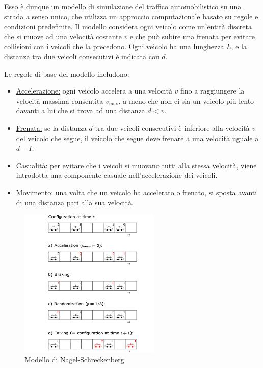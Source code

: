 \documentclass[11pt]{article}
\begin{document}
Esso è dunque un modello di simulazione del traffico automobilistico su una strada a senso unico, che utilizza un approccio computazionale basato su regole e condizioni predefinite.
Il modello considera ogni veicolo come un'entità discreta che si muove ad una velocità costante $v$ e che può subire una frenata per evitare collisioni con i veicoli che la precedono. Ogni veicolo ha una lunghezza $L$, e la distanza tra due veicoli consecutivi è indicata con $d$. 

Le regole di base del modello includono:
\begin{itemize}
\item \underline{Accelerazione:} ogni veicolo accelera a una velocità $v$ fino a raggiungere la velocità massima consentita $v_\max$, a meno che non ci sia un veicolo più lento davanti a lui che si trova ad una distanza $d<v$.

\item \underline{Frenata:} se la distanza $d$ tra due veicoli consecutivi è inferiore alla velocità $v$ del veicolo che segue, il veicolo che segue deve frenare a una velocità uguale a $d-I$.

\item \underline{Casualità:} per evitare che i veicoli si muovano tutti alla stessa velocità, viene introdotta una componente casuale nell'accelerazione dei veicoli.

\item \underline{Movimento:} una volta che un veicolo ha accelerato o frenato, si sposta avanti di una distanza pari alla sua velocità.
\end{itemize}

\begin{figure}
    \centering
    \includegraphics[width=0.6\textwidth]{trafficflow.png}
    \caption{Modello di Nagel-Schreckenberg}
\end{figure}
\end{document}

